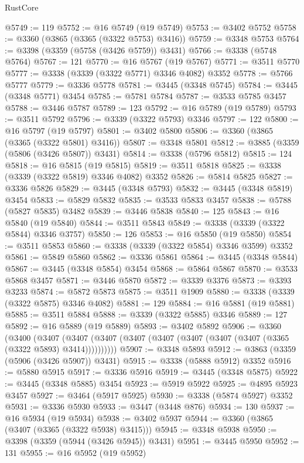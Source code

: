 \begin{lexlean}{RustCore}
\begin{coremodule}
@5749 := 119
@5752 := @16 @5749 (@19 @5749)
@5753 := @3402 @5752
@5758 := @3360 (@3865 (@3365 (@3322 @5753) @3416))
@5759 := @3348 @5753
@5764 := @3398 (@3359 (@5758 (@3426 @5759)) @3431)
@5766 := @3338 (@5748 @5764)
@5767 := 121
@5770 := @16 @5767 (@19 @5767)
@5771 := @3511 @5770
@5777 := @3338 (@3339 (@3322 @5771) @3346 @4082) @3352
@5778 := @5766 @5777
@5779 := @3336 @5778
@5781 := @3445 (@3348 @5745)
@5784 := @3445 (@3348 @5771) @3454
@5785 := @5781 @5784
@5787 := @3533 @5785 @3457
@5788 := @3446 @5787
@5789 := 123
@5792 := @16 @5789 (@19 @5789)
@5793 := @3511 @5792
@5796 := @3339 (@3322 @5793) @3346
@5797 := 122
@5800 := @16 @5797 (@19 @5797)
@5801 := @3402 @5800
@5806 := @3360 (@3865 (@3365 (@3322 @5801) @3416))
@5807 := @3348 @5801
@5812 := @3885 (@3359 (@5806 (@3426 @5807)) @3431)
@5814 := @3338 (@5796 @5812)
@5815 := 124
@5818 := @16 @5815 (@19 @5815)
@5819 := @3511 @5818
@5825 := @3338 (@3339 (@3322 @5819) @3346 @4082) @3352
@5826 := @5814 @5825
@5827 := @3336 @5826
@5829 := @3445 (@3348 @5793)
@5832 := @3445 (@3348 @5819) @3454
@5833 := @5829 @5832
@5835 := @3533 @5833 @3457
@5838 := @5788 (@5827 @5835) @3482
@5839 := @3446 @5838
@5840 := 125
@5843 := @16 @5840 (@19 @5840)
@5844 := @3511 @5843
@5849 := @3338 (@3339 (@3322 @5844) @3346 @3757)
@5850 := 126
@5853 := @16 @5850 (@19 @5850)
@5854 := @3511 @5853
@5860 := @3338 (@3339 (@3322 @5854) @3346 @3599) @3352
@5861 := @5849 @5860
@5862 := @3336 @5861
@5864 := @3445 (@3348 @5844)
@5867 := @3445 (@3348 @5854) @3454
@5868 := @5864 @5867
@5870 := @3533 @5868 @3457
@5871 := @3446 @5870
@5872 := @3339 @3376
@5873 := @3393 @3233
@5874 := @5872 @5873
@5875 := @3511 @1909
@5880 := @3338 (@3339 (@3322 @5875) @3346 @4082)
@5881 := 129
@5884 := @16 @5881 (@19 @5881)
@5885 := @3511 @5884
@5888 := @3339 (@3322 @5885) @3346
@5889 := 127
@5892 := @16 @5889 (@19 @5889)
@5893 := @3402 @5892
@5906 := @3360
    (@3400
      (@3407 (@3407 (@3407 (@3407 (@3407 (@3407 (@3407 (@3407 (@3365 (@3322 @5893) @3414))))))))))
@5907 := @3348 @5893
@5912 := @3863 (@3359 (@5906 (@3426 @5907)) @3431)
@5915 := @3338 (@5888 @5912) @3352
@5916 := @5880 @5915
@5917 := @3336 @5916
@5919 := @3445 (@3348 @5875)
@5922 := @3445 (@3348 @5885) @3454
@5923 := @5919 @5922
@5925 := @4895 @5923 @3457
@5927 := @3464 (@5917 @5925)
@5930 := @3338 (@5874 @5927) @3352
@5931 := @3336 @5930
@5933 := @3447 (@3448 @876)
@5934 := 130
@5937 := @16 @5934 (@19 @5934)
@5938 := @3402 @5937
@5944 := @3360 (@3865 (@3407 (@3365 (@3322 @5938) @3415)))
@5945 := @3348 @5938
@5950 := @3398 (@3359 (@5944 (@3426 @5945)) @3431)
@5951 := @3445 @5950
@5952 := 131
@5955 := @16 @5952 (@19 @5952)

\end{coremodule}
\end{lexlean}
